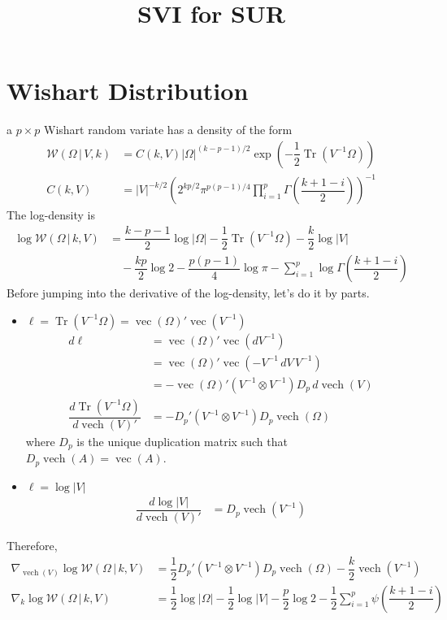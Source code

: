 \documentclass[12pt]{article}
\DeclareMathOperator{\Tr}{Tr}
\DeclareMathOperator{\vvv}{vec}
\DeclareMathOperator{\vvvh}{vech}
\begin{document}
\title{SVI for SUR}

\section{Wishart Distribution}
  a $p\times p$ Wishart random variate has a density of the form
  \begin{align}
    \mathcal{W}\left(\Omega\,|\,V,k\right) &= C(k,V)|\Omega|^{(k-p-1)/2}\exp\left(-\dfrac{1}{2}\Tr\left(V^{-1}\Omega\right)\right)\\
    C(k,V) &= |V|^{-k/2}\left(2^{kp/2}\pi^{p(p-1)/4}\prod_{i=1}^{p}\Gamma\left(\dfrac{k+1-i}{2}\right)\right)^{-1}
  \end{align}
  The log-density is
  \begin{align}
    \log\mathcal{W}\left(\Omega\,|\,k,V\right) &= \dfrac{k-p-1}{2}\log|\Omega|-\dfrac{1}{2}\Tr\left(V^{-1}\Omega\right)-\dfrac{k}{2}\log|V|\\
    &\quad -\dfrac{kp}{2}\log 2-\dfrac{p(p-1)}{4}\log \pi -\sum_{i=1}^{p}\log\Gamma\left(\dfrac{k+1-i}{2}\right)
  \end{align}
  Before jumping into the derivative of the log-density, let's do it by parts.
  \begin{itemize}
    \item $\ell=\Tr\left(V^{-1}\Omega\right)=\vvv(\Omega)'\vvv\left(V^{-1}\right)$
    \begin{align}
      d\ell &= \vvv(\Omega)'\vvv\left(dV^{-1}\right)\\
            &= \vvv(\Omega)'\vvv\left(-V^{-1}\,dV\,V^{-1}\right)\\
            &= -\vvv(\Omega)'\left(V^{-1}\otimes V^{-1}\right)D_{p}\,d\vvvh\left(V\right)\\
      \dfrac{d \Tr\left(V^{-1}\Omega\right)}{d\vvvh(V)'} &= -D_{p}'\left(V^{-1}\otimes V^{-1}\right)D_{p}\vvvh(\Omega)
    \end{align}
    where $D_{p}$ is the unique duplication matrix such that $D_{p}\vvvh(A)=\vvv(A)$.
    \item $\ell=\log|V|$
    \begin{align}
      \dfrac{d\log|V|}{d\vvvh(V)'} &= D_{p}\vvvh\left(V^{-1}\right)
    \end{align}
  \end{itemize}
  Therefore,
  \begin{align}
    \nabla_{\vvvh(V)}\log\mathcal{W}(\Omega\,|\,k,V) &= \dfrac{1}{2}D_{p}'\left(V^{-1}\otimes V^{-1}\right)D_{p}\vvvh(\Omega)-\dfrac{k}{2}\vvvh\left(V^{-1}\right)\\
    \nabla_{k}\log\mathcal{W}(\Omega\,|\,k,V) &= \dfrac{1}{2}\log|\Omega|-\dfrac{1}{2}\log|V|-\dfrac{p}{2}\log 2-\dfrac{1}{2}\sum_{i=1}^{p}\psi\left(\dfrac{k+1-i}{2}\right)
  \end{align}
\end{document}
